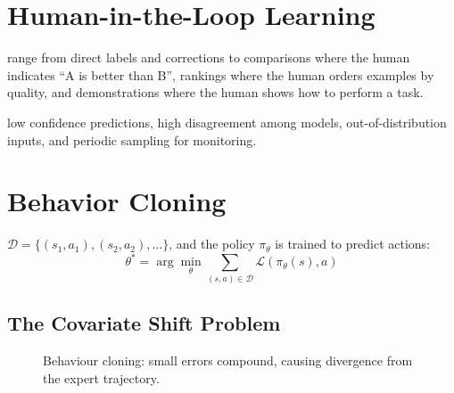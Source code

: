\section{Human-in-the-Loop Learning}


 range from direct labels and corrections to comparisons where the human indicates ``A is better than B'', rankings where the human orders examples by quality, and demonstrations where the human shows how to perform a task.

 low confidence predictions, high disagreement among models, out-of-distribution inputs, and periodic sampling for monitoring.


\section{Behavior Cloning}


 $\mathcal{D} = \{(s_1, a_1), (s_2, a_2), \ldots\}$, and the policy $\pi_\theta$ is trained to predict actions:
\begin{equation}
    \theta^* = \arg\min_\theta \sum_{(s,a) \in \mathcal{D}} \mathcal{L}(\pi_\theta(s), a)
\end{equation}

\subsection{The Covariate Shift Problem}

\begin{figure}
\centering
{}
\caption{Behaviour cloning: small errors compound, causing divergence from the expert trajectory.}
\label{fig:covariate_shift}
\end{figure}

